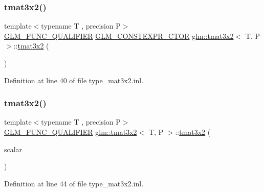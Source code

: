 \subsubsection{\texorpdfstring{tmat3x2()}{tmat3x2()}\hspace{0.1cm}{\footnotesize\ttfamily [4/22]}}
{\footnotesize\ttfamily template$<$typename T , precision P$>$ \\
\mbox{\hyperlink{setup_8hpp_a33fdea6f91c5f834105f7415e2a64407}{G\+L\+M\+\_\+\+F\+U\+N\+C\+\_\+\+Q\+U\+A\+L\+I\+F\+I\+ER}} \mbox{\hyperlink{setup_8hpp_ad34178a09666081abdb573c14d1f4a5a}{G\+L\+M\+\_\+\+C\+O\+N\+S\+T\+E\+X\+P\+R\+\_\+\+C\+T\+OR}} \mbox{\hyperlink{structglm_1_1tmat3x2}{glm\+::tmat3x2}}$<$ T, P $>$\+::\mbox{\hyperlink{structglm_1_1tmat3x2}{tmat3x2}} (\begin{DoxyParamCaption}\item[{\mbox{\hyperlink{namespaceglm_a807df837905ec286f806a536af03b57f}{ctor}}}]{ }\end{DoxyParamCaption})\hspace{0.3cm}{\ttfamily [explicit]}}



Definition at line 40 of file type\+\_\+mat3x2.\+inl.

\mbox{\label{structglm_1_1tmat3x2_a874b837bb746cd36e0e98d7d692a29f2}} 
\subsubsection{\texorpdfstring{tmat3x2()}{tmat3x2()}\hspace{0.1cm}{\footnotesize\ttfamily [5/22]}}
{\footnotesize\ttfamily template$<$typename T , precision P$>$ \\
\mbox{\hyperlink{setup_8hpp_a33fdea6f91c5f834105f7415e2a64407}{G\+L\+M\+\_\+\+F\+U\+N\+C\+\_\+\+Q\+U\+A\+L\+I\+F\+I\+ER}} \mbox{\hyperlink{structglm_1_1tmat3x2}{glm\+::tmat3x2}}$<$ T, P $>$\+::\mbox{\hyperlink{structglm_1_1tmat3x2}{tmat3x2}} (\begin{DoxyParamCaption}\item[{T}]{scalar }\end{DoxyParamCaption})\hspace{0.3cm}{\ttfamily [explicit]}}



Definition at line 44 of file type\+\_\+mat3x2.\+inl.

